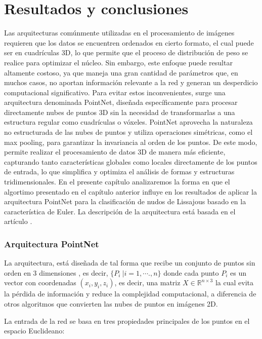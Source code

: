 \chapter{Resultados y conclusiones}
Las arquitecturas comúnmente utilizadas en el procesamiento de imágenes requieren que los datos se encuentren ordenados en cierto formato, el cual puede ser en cuadrículas 3D, lo que permite que el proceso de distribución de peso se realice para optimizar el núcleo. Sin embargo, este enfoque puede resultar altamente costoso, ya que maneja una gran cantidad de parámetros que, 
en muchos casos, no aportan información relevante a la red y generan un desperdicio computacional significativo.
Para evitar estos inconvenientes, surge una arquitectura denominada PointNet, diseñada específicamente para procesar directamente nubes de puntos 3D sin la necesidad de 
transformarlas a una estructura regular como cuadrículas o vóxeles. PointNet aprovecha la naturaleza no estructurada de las nubes de puntos y utiliza operaciones simétricas, 
como el max pooling, para garantizar la invariancia al orden de los puntos. De este modo, permite realizar el procesamiento de datos 3D de manera más eficiente, 
capturando tanto características globales como locales directamente de los puntos de entrada, lo que simplifica y optimiza el análisis de formas y estructuras tridimensionales. \cite{pointnet}
En el presente capítulo analizaremos la forma en que el algortimo presentado en el capítulo anterior 
influye en los resultados de aplicar la arquitectura PointNet para la clasificación de nudos de Lissajous 
basado en la característica de Euler.
La descripción de la arquitectura está basada en el artículo \cite{pointnet}.

\subsection{Arquitectura PointNet}
La arquitectura, está diseñada de tal forma que recibe un 
conjunto de puntos sin orden en 3 dimensiones , es decir,
$\{P_i\ | i = 1, \cdots .,n\}$ donde cada punto $P_i$ es 
un vector con coordenadas $(x_i,y_i,z_i)$, es decir, una matriz $X \in \mathbb{R}^{n \times 3}$ la cual evita la pérdida
de información y reduce la complejidad computacional, a diferencia 
de otros algoritmos que convierten las nubes de puntos en imágenes 2D.

La entrada de la red se basa en tres propiedades principales de los puntos en el 
espacio Euclideano:

